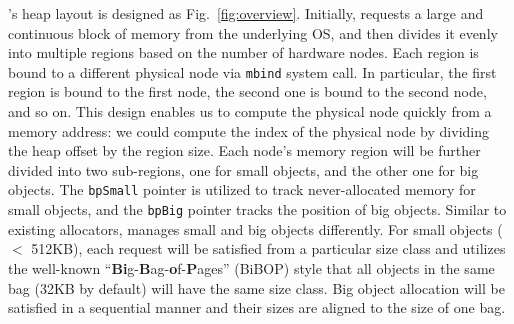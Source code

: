 \NM{}'s heap layout is designed as  Fig.~\ref{fig:overview}. Initially, \NM{} requests a large and continuous block of memory from the underlying OS, and then divides it evenly into multiple regions based on the number of hardware nodes. Each region is bound to a different physical node via \texttt{mbind} system call. 
In particular, the first region is bound to the first node, the second one is bound to the second node, and so on. This design enables us to compute the physical node quickly from a memory address: we could compute the index of the physical node by dividing the heap offset by the region size. 
Each node's memory region will be further divided into two sub-regions, one for small objects, and the other one for big objects. The \texttt{bpSmall} pointer is utilized to track never-allocated memory for small objects, and the \texttt{bpBig} pointer tracks the position of big objects. Similar to existing allocators, \NM{} manages small and big objects differently. 
For small objects ($<$ 512KB), each request will be satisfied from a particular size class
and \NM{} utilizes the well-known ``\textbf{Bi}g-\textbf{B}ag-\textbf{o}f-\textbf{P}ages'' (BiBOP) style that all objects in the same bag (32KB by default) will have the same size class. 
Big object allocation will be satisfied in a sequential manner and their sizes are aligned to the size of one bag.

